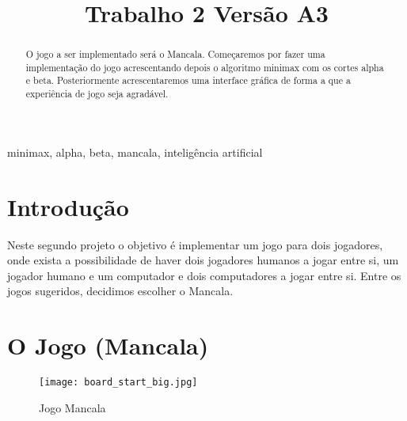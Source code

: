 \documentclass[conference]{IEEEtran}
\begin{document}
\title{Trabalho 2 Vers\~ao A3\\
}

\author{
\and
{}
}

\maketitle

\begin{abstract}
O jogo a ser implementado ser\'a o Mancala. Começaremos por fazer uma implementaç\~ao do jogo acrescentando depois o algoritmo minimax com os cortes alpha e beta. Posteriormente acrescentaremos uma interface gr\'afica de forma a que a experi\^encia de jogo seja agrad\'avel.
\end{abstract}

\begin{IEEEkeywords}
minimax, alpha, beta, mancala, intelig\^encia artificial
\end{IEEEkeywords}

\section{Introdu\c c\~ao}
Neste segundo projeto o objetivo \'e implementar um jogo para dois jogadores, onde exista a possibilidade de haver dois jogadores humanos a jogar entre si, um jogador humano e um computador e dois computadores a jogar entre si.
Entre os jogos sugeridos, decidimos escolher o Mancala. 


\section{O Jogo (Mancala)}

\begin{figure}[htbp]
\centerline{\texttt{[image: board\_start\_big.jpg]}}
\caption{Jogo Mancala}
\label{img}
\end{figure}
\end{document}
